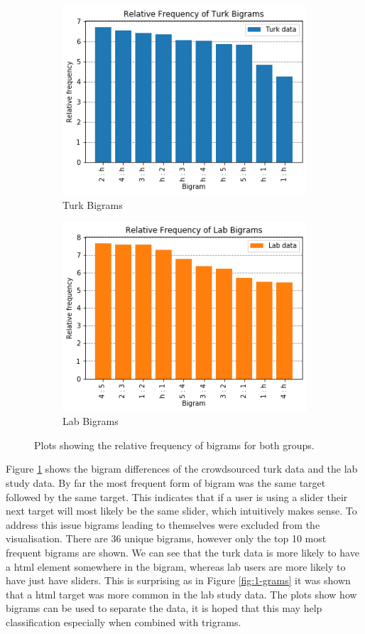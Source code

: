\documentclass{article}
\begin{document}
\begin{figure}[h!]
    \centering
    \begin{subfigure}[c]{0.4\linewidth}
        \centering
        \includegraphics[scale=0.55]{Images/turk-bigrams.png}
        \caption{Turk Bigrams}
    \end{subfigure}    
    \hfill
    \begin{subfigure}[c]{0.4\linewidth}
        \centering
        \includegraphics[scale=0.55]{Images/lab-bigrams.png}
        \caption{Lab Bigrams}
    \end{subfigure}  
    \caption{Plots showing the relative frequency of bigrams for both groups.}
    \label{fig:bigrams}
\end{figure}

Figure \ref{fig:bigrams} shows the bigram differences of the crowdsourced turk data and the lab study data.
By far the most frequent form of bigram was the same target followed by the same target.
This indicates that if a user is using a slider their next target will most likely be the same slider, which intuitively makes sense.
To address this issue bigrams leading to themselves were excluded from the visualisation.
There are 36 unique bigrams, however only the top 10 most frequent bigrams are shown.
We can see that the turk data is more likely to have a html element somewhere in the bigram, whereas lab users are more likely to have just have sliders.
This is surprising as in Figure \ref{fig:1-grams} it was shown that a html target was more common in the lab study data.
The plots show how bigrams can be used to separate the data, it is hoped that this may help classification especially when combined with trigrams.
\end{document}
